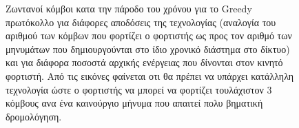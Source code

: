 \begin{figure}[H]
  \centering
  \caption{Ζωντανοί κόμβοι κατα την πάροδο του χρόνου για το Greedy πρωτόκολλο για διάφορες αποδόσεις της τεχνολογίας (αναλογία του αριθμού των κόμβων που φορτίζει
ο φορτιστής ως προς τον αριθμό των μηνυμάτων που δημιουργούνται στο ίδιο χρονικό διάστημα στο δίκτυο) και για διάφορα ποσοστά αρχικής ενέργειας που δίνονται στον
κινητό φορτιστή. Από τις εικόνες φαίνεται οτι θα πρέπει να υπάρχει κατάλληλη τεχνολογία ώστε ο φορτιστής να μπορεί να φορτίζει τουλάχιστον 3 κόμβους ανα ένα
καινούργιο μήνυμα που απαιτεί πολυ βηματική δρομολόγηση.}
  \label{fig:5exp_1_1}
\end{figure}


